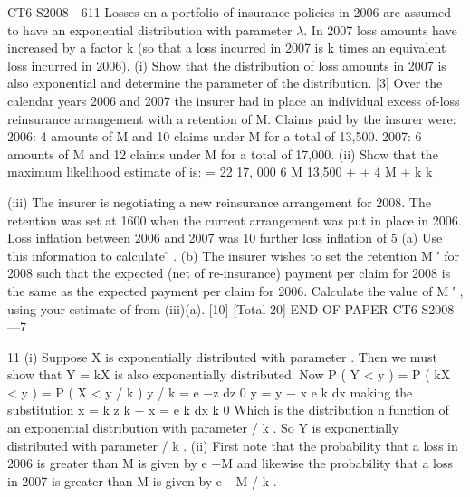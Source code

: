 \documentclass[a4paper,12pt]{article}
\begin{document}
CT6 S2008—611
Losses on a portfolio of insurance policies in 2006 are assumed to have an exponential distribution with parameter $\lambda$. In 2007 loss amounts have increased by a
factor k (so that a loss incurred in 2007 is k times an equivalent loss incurred in 2006).
(i)
Show that the distribution of loss amounts in 2007 is also exponential and
determine the parameter of the distribution.
[3]
Over the calendar years 2006 and 2007 the insurer had in place an individual excess of-loss reinsurance arrangement with a retention of M. Claims paid by the insurer
were:
2006: 4 amounts of M and 10 claims under M for a total of 13,500.
2007: 6 amounts of M and 12 claims under M for a total of 17,000.
(ii)
Show that the maximum likelihood estimate of \lambda  is:
\hat{\lambda} =
22
17, 000
6 M
13,500 +
+ 4 M +
k
k

(iii)
The insurer is negotiating a new reinsurance arrangement for 2008. The retention was set at 1600 when the current arrangement was put in place in 2006. Loss inflation between 2006 and 2007 was 10%
further loss inflation of 5%
(a) Use this information to calculate \lambda ̂ .
(b) The insurer wishes to set the retention M ′ for 2008 such that the expected (net of re-insurance) payment per claim for 2008 is the same
as the expected payment per claim for 2006. Calculate the value of M ′ , using your estimate of \lambda  from (iii)(a).
[10]
[Total 20]
END OF PAPER
CT6 S2008—7

11
(i)
Suppose X is exponentially distributed with parameter \lambda . Then we must show
that Y = kX is also exponentially distributed.
Now
P ( Y < y ) = P ( kX < y )
= P ( X < y / k )
y / k
=
\int 
\lambda  e −\lambda  z dz
0
y
= 
y
\lambda 
− x
\lambda  e k
dx
making the substitution x = k z
k
\lambda 
\lambda  − x
= \int  e k dx
k
0
Which is the distribution n function of an exponential distribution with parameter \lambda  / k . So Y is exponentially distributed with parameter \lambda  / k .
(ii)
First note that the probability that a loss in 2006 is greater than M is given by e −\lambda  M and likewise the probability that a loss in 2007 is greater than M is
given by e −\lambda  M / k .
\end{document}
